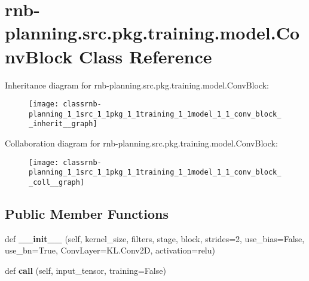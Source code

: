 \hypertarget{classrnb-planning_1_1src_1_1pkg_1_1training_1_1model_1_1_conv_block}{}\section{rnb-\/planning.src.\+pkg.\+training.\+model.\+Conv\+Block Class Reference}
\label{classrnb-planning_1_1src_1_1pkg_1_1training_1_1model_1_1_conv_block}


Inheritance diagram for rnb-\/planning.src.\+pkg.\+training.\+model.\+Conv\+Block\+:
\nopagebreak
\begin{figure}[H]
\begin{center}
\leavevmode
\texttt{[image: classrnb-planning\_1\_1src\_1\_1pkg\_1\_1training\_1\_1model\_1\_1\_conv\_block\_\_inherit\_\_graph]}
\end{center}
\end{figure}


Collaboration diagram for rnb-\/planning.src.\+pkg.\+training.\+model.\+Conv\+Block\+:
\nopagebreak
\begin{figure}[H]
\begin{center}
\leavevmode
\texttt{[image: classrnb-planning\_1\_1src\_1\_1pkg\_1\_1training\_1\_1model\_1\_1\_conv\_block\_\_coll\_\_graph]}
\end{center}
\end{figure}
\subsection*{Public Member Functions}
\begin{DoxyCompactItemize}
\item 
\mbox{\label{classrnb-planning_1_1src_1_1pkg_1_1training_1_1model_1_1_conv_block_a1fffe669404961596b4e39428815edb8}} 
def {\bfseries \+\_\+\+\_\+init\+\_\+\+\_\+} (self, kernel\+\_\+size, filters, stage, block, strides=2, use\+\_\+bias=False, use\+\_\+bn=True, Conv\+Layer=K\+L.\+Conv2D, activation=\textquotesingle{}relu\textquotesingle{})
\item 
\mbox{\label{classrnb-planning_1_1src_1_1pkg_1_1training_1_1model_1_1_conv_block_acdf522e2ef2ae27309b78d81ab7cefc0}} 
def {\bfseries call} (self, input\+\_\+tensor, training=False)
\end{DoxyCompactItemize}
